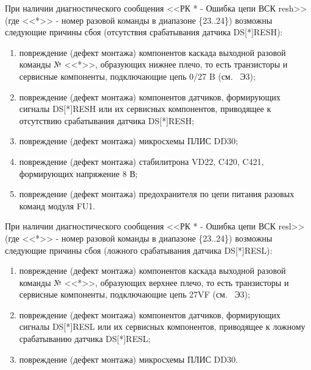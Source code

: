 \begin{sloppypar}
  \end{sloppypar}
    
  \begin{sloppypar}
    \subpoint При наличии диагностического сообщения <<РК * - Ошибка цепи ВСК resh>>
	      (где <<*>> - номер разовой команды в диапазоне \{23..24\}) возможны следующие причины сбоя (отсутствия срабатывания датчика DS[*]RESH):
	\label{subdefects:rk_out_0v_trig_fault_resh}
	\begin{enumerate}
	  \item повреждение (дефект монтажа) компонентов каскада выходной разовой команды № <<*>>, образующих нижнее плечо, 
		то есть транзисторы и сервисные компоненты, подключающие цепь 0/27 B (см. \DocProductSignature~Э3);
	  \item повреждение (дефект монтажа) компонентов датчиков, формирующих сигналы DS[*]RESH или их сервисных компонентов, приводящее к отсутствию срабатывания датчика DS[*]RESH;
	  \item повреждение (дефект монтажа) микросхемы ПЛИС DD30;
	  \item повреждение (дефект монтажа) стабилитрона VD22, C420, C421, формирующих напряжение 8 В;
	  \item повреждение (дефект монтажа) предохранителя по цепи питания разовых команд модуля FU1.
	\end{enumerate} 
	
    \subpoint При наличии диагностического сообщения <<РК * - Ошибка цепи ВСК resl>> 
	      (где <<*>> - номер разовой команды в диапазоне \{23..24\}) возможны следующие причины сбоя (ложного срабатывания датчика DS[*]RESL):
	 \label{subdefects:rk_out_0v_trig_fault_resl}
	 \begin{enumerate}
	  \item повреждение (дефект монтажа) компонентов каскада выходной разовой команды № <<*>>, образующих верхнее плечо, 
		то есть транзисторы и сервисные компоненты, подключающие цепь 27VF (см. \DocProductSignature~Э3);
	  \item повреждение (дефект монтажа) компонентов датчиков, формирующих сигналы DS[*]RESL или их сервисных компонентов, приводящее к ложному срабатыванию датчика DS[*]RESL;
	  \item повреждение (дефект монтажа) микросхемы ПЛИС DD30.
	\end{enumerate}
	

\end{sloppypar}
